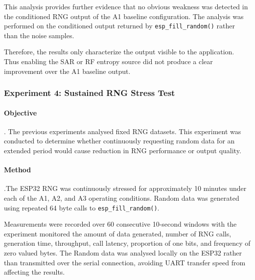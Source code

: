 \documentclass[a4paper, 12pt]{article}
\begin{document}
This analysis provides further evidence that no obvious weakness was
detected in the conditioned RNG output of the A1 baseline configuration. The analysis was performed on the conditioned output returned by \texttt{esp\_fill\_random()} rather than the noise samples.

Therefore, the results only characterize the output visible to the
application. Thus enabling the SAR or RF entropy source did
not produce a clear improvement over the A1 baseline output.

\subsubsection{Experiment 4: Sustained RNG Stress Test}

\paragraph{Objective}. The previous experiments analysed fixed RNG datasets. This experiment was
conducted to determine whether continuously requesting random data for an
extended period would cause reduction in RNG performance or output quality.

\paragraph{Method}.The ESP32 RNG was continuously stressed for approximately 10 minutes under
each of the A1, A2, and A3 operating conditions. Random data was generated
using repeated 64 byte calls to \texttt{esp\_fill\_random()}.

Measurements were recorded over 60 consecutive 10-second windows with the
experiment monitored the amount of data generated, number of RNG calls,
generation time, throughput, call latency, proportion of one bits, and
frequency of zero valued bytes. The Random data was analysed locally on the ESP32
rather than transmitted over the serial connection, avoiding UART transfer
speed from affecting the results.
\end{document}
